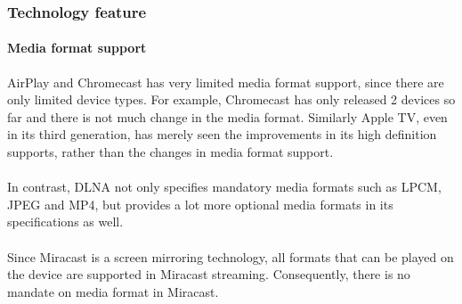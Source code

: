 \subsubsection{Technology feature} 
\paragraph{Media format support} 
AirPlay and Chromecast has very limited media format support, since there are 
only limited device types. For example, Chromecast has only released 2 devices so far and there is not much change in the media format. Similarly Apple TV, even in its third generation,  has merely seen the improvements in its high definition supports, rather than the changes in media format support.  \\
\\
In contrast, DLNA not only specifies mandatory media formats such as LPCM, JPEG  and MP4, but provides a lot more optional media formats in its specifications as well. \\
\\
Since Miracast is a screen mirroring technology, all formats that can be played on the device are supported in Miracast streaming. Consequently, there is no mandate on media format in Miracast.  
